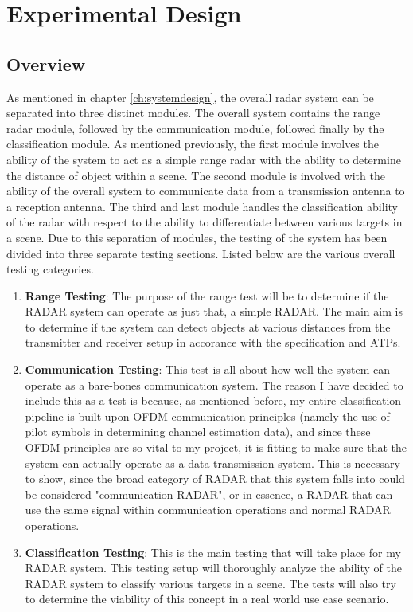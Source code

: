 \documentclass[11pt]{report}
\begin{document}
\section{Experimental Design}
\subsection{Overview}
As mentioned in chapter \ref{ch:systemdesign}, the overall radar system can be separated into three distinct modules. The overall system contains the range radar module, followed by the communication module, followed finally by the classification module. As mentioned previously, the first module involves the ability of the system to act as a simple range radar with the ability to determine the distance of object within a scene. The second module is involved with the ability of the overall system to communicate data from a transmission antenna to a reception antenna. The third and last module handles the classification ability of the radar with respect to the ability to differentiate between various targets in a scene. Due to this separation of modules, the testing of the system has been divided into three separate testing sections. Listed below are the various overall testing categories.

\begin{enumerate}
    \item \textbf{Range Testing}: The purpose of the range test will be to determine if the RADAR system can operate as just that, a simple RADAR. The main aim is to determine if the system can detect objects at various distances from the transmitter and receiver setup in accorance with the specification and ATPs.
    \item \textbf{Communication Testing}: This test is all about how well the system can operate as a bare-bones communication system. The reason I have decided to include this as a test is because, as mentioned before, my entire classification pipeline is built upon OFDM communication principles (namely the use of pilot symbols in determining channel estimation data), and since these OFDM principles are so vital to my project, it is fitting to make sure that the system can actually operate as a data transmission system. This is necessary to show, since the broad category of RADAR that this system falls into could be considered "communication RADAR", or in essence, a RADAR that can use the same signal within communication operations and normal RADAR operations.
    \item \textbf{Classification Testing}: This is the main testing that will take place for my RADAR system. This testing setup will thoroughly analyze the ability of the RADAR system to classify various targets in a scene. The tests will also try to determine the viability of this concept in a real world use case scenario.
\end{enumerate}
\end{document}
